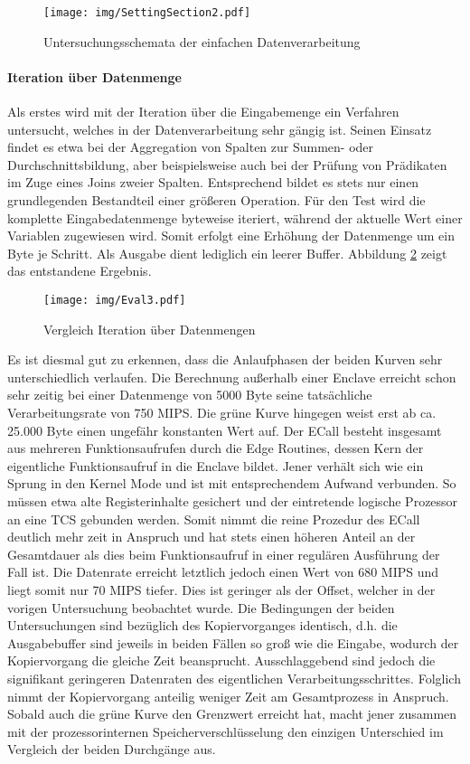 \begin{figure}[h]
	\texttt{[image: img/SettingSection2.pdf]}
	\centering
	\caption{Untersuchungsschemata der einfachen Datenverarbeitung}
	\label{fig:settingsection2}
\end{figure}

\paragraph{Iteration über Datenmenge}

Als erstes wird mit der Iteration über die Eingabemenge ein Verfahren untersucht, welches in der Datenverarbeitung sehr gängig ist. Seinen Einsatz findet es etwa bei der Aggregation von Spalten zur Summen- oder Durchschnittsbildung, aber beispielsweise auch bei der Prüfung von Prädikaten im Zuge eines Joins zweier Spalten. Entsprechend bildet es stets nur einen grundlegenden Bestandteil einer größeren Operation. Für den Test wird die komplette Eingabedatenmenge byteweise iteriert, während der aktuelle Wert einer Variablen zugewiesen wird. Somit erfolgt eine Erhöhung der Datenmenge um ein Byte je Schritt. Als Ausgabe dient lediglich ein leerer Buffer. Abbildung \ref{fig:eval3} zeigt das entstandene Ergebnis.

\begin{figure}[h]
	\texttt{[image: img/Eval3.pdf]}
	\centering
	\caption{Vergleich Iteration über Datenmengen}
	\label{fig:eval3}
\end{figure}

Es ist diesmal gut zu erkennen, dass die Anlaufphasen der beiden Kurven sehr unterschiedlich verlaufen. Die Berechnung außerhalb einer Enclave erreicht schon sehr zeitig bei einer Datenmenge von 5000 Byte seine tatsächliche Verarbeitungsrate von 750 \ac{MIPS}. Die grüne Kurve hingegen weist erst ab ca. 25.000 Byte einen ungefähr konstanten Wert auf. Der \ac{ECall} besteht insgesamt aus mehreren Funktionsaufrufen durch die Edge Routines, dessen Kern der eigentliche Funktionsaufruf in die Enclave bildet. Jener verhält sich wie ein Sprung in den Kernel Mode und ist mit entsprechendem Aufwand verbunden. So müssen etwa alte Registerinhalte gesichert und der eintretende logische Prozessor an eine \ac{TCS} gebunden werden. Somit nimmt die reine Prozedur des \ac{ECall} deutlich mehr zeit in Anspruch und hat stets einen höheren Anteil an der Gesamtdauer als dies beim Funktionsaufruf in einer regulären Ausführung der Fall ist. Die Datenrate erreicht letztlich jedoch einen Wert von 680 \ac{MIPS} und liegt somit nur 70 \ac{MIPS} tiefer. Dies ist geringer als der Offset, welcher in der vorigen Untersuchung beobachtet wurde. Die Bedingungen der beiden Untersuchungen sind bezüglich des Kopiervorganges identisch, d.h. die Ausgabebuffer sind jeweils in beiden Fällen so groß wie die Eingabe, wodurch der Kopiervorgang die gleiche Zeit beansprucht. Ausschlaggebend sind jedoch die signifikant geringeren Datenraten des eigentlichen Verarbeitungsschrittes. Folglich nimmt der Kopiervorgang anteilig weniger Zeit am Gesamtprozess in Anspruch. Sobald auch die grüne Kurve den Grenzwert erreicht hat, macht jener zusammen mit der prozessorinternen Speicherverschlüsselung den einzigen Unterschied im Vergleich der beiden Durchgänge aus.

